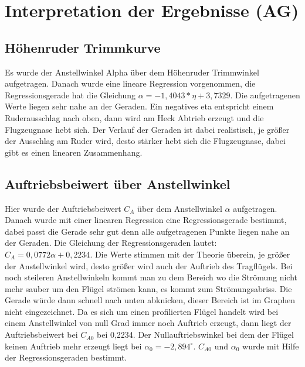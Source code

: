 \chapter{Interpretation der Ergebnisse (AG)}


\section{Höhenruder Trimmkurve}
Es wurde der Anstellwinkel Alpha über dem Höhenruder Trimmwinkel aufgetragen. Danach wurde eine lineare Regression vorgenommen, die Regressionsgerade hat die Gleichung $\alpha= -1,4043*\eta + 3,7329$. Die aufgetragenen Werte liegen sehr nahe an der Geraden. Ein negatives eta entspricht einem Ruderausschlag nach oben, dann wird am Heck Abtrieb erzeugt und die Flugzeugnase hebt sich. Der Verlauf der Geraden ist dabei realistisch, je größer der Ausschlag am Ruder wird, desto stärker hebt sich die Flugzeugnase, dabei gibt es einen linearen Zusammenhang.
 
\section{Auftriebsbeiwert über Anstellwinkel}
Hier wurde der Auftriebsbeiwert $C_A$ über dem Anstellwinkel $\alpha$ aufgetragen. Danach wurde mit einer linearen Regression eine Regressionsgerade bestimmt, dabei passt die Gerade sehr gut denn alle aufgetragenen Punkte liegen nahe an der Geraden. Die Gleichung der Regressionsgeraden lautet: $C_A=0,0772 \alpha +0,2234$. Die Werte stimmen mit der Theorie überein, je größer der Anstellwinkel wird, desto größer wird auch der Auftrieb des Tragflügels. Bei noch steileren Anstellwinkeln kommt man zu dem Bereich wo die Strömung nicht mehr sauber um den Flügel strömen kann, es kommt zum Strömungsabriss. Die Gerade würde dann schnell nach unten abknicken, dieser Bereich ist im Graphen nicht eingezeichnet. Da es sich um einen profilierten Flügel handelt wird bei einem Anstellwinkel von null Grad immer noch Auftrieb erzeugt, dann liegt der Auftriebsbeiwert bei $C_{A0}$ bei 0,2234. Der Nullauftriebswinkel bei dem der Flügel keinen Auftrieb mehr erzeugt liegt bei $\alpha _0 = -2,894^\circ$. $C_{A0}$ und $\alpha_0$ wurde mit Hilfe der Regressionsgeraden bestimmt.

